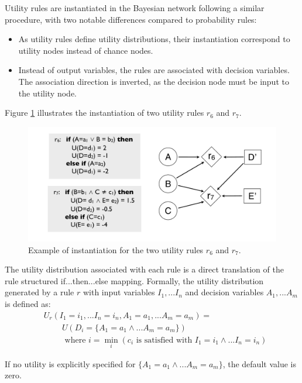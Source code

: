 Utility rules are instantiated in the Bayesian network following a similar procedure, with two notable differences compared to probability rules: \begin{itemize}
\item As utility rules define utility distributions, their instantiation correspond to utility nodes instead of chance nodes.
\item Instead of output variables, the rules are associated with decision variables.  The association direction is inverted, as the decision node must be input to the utility node.
\end{itemize} 

Figure \ref{fig:instantitionutil} illustrates the instantiation of two utility rules $r_6$ and $r_7$. 

\begin{figure}[h]
\centering
\includegraphics[scale=0.25]{imgs/ruleinstantiation2.pdf}
\caption{Example of instantiation for the two utility rules $r_6$ and $r_7$.}
\label{fig:instantitionutil}
\end{figure}


The utility distribution associated with each rule is a direct translation of the rule structured if...then...else mapping.  Formally, the utility distribution generated by a rule $r$ with input variables $I_1,...I_n$ and decision variables $A_1,...A_m$ is defined as:
\begin{align}
& U_r(I_1\!=\!i_1,... I_n\!=\!i_n, A_1\!=\!a_1,... A_m\!=\!a_m) = \nonumber \\ 
& \; \; \; \; \; \; \; \; U(D_i = \{A_1\!=\!a_1 \land... A_m\!=\!a_m\}) \label{eq:utildistrib}\\
&  \; \; \; \; \; \; \; \; \text{ where } i = \min_i (c_i \text{ is satisfied with } I_1\!=\!i_1 \land ... I_n\!=\!i_n) \nonumber
\end{align}

If no utility is explicitly specified for $\{A_1\!=\!a_1 \land... A_m\!=\!a_m\}$, the default value is zero. 

